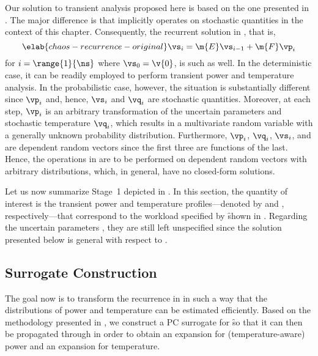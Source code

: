 Our solution to transient analysis proposed here is based on the one presented
in . The major difference is that
 implicitly operates on stochastic quantities in the
context of this chapter. Consequently, the recurrent solution in
, that is,
\begin{equation} \elab{chaos-recurrence-original}
  \vs_i = \m{E} \vs_{i - 1} + \m{F} \vp_i
\end{equation}
for $i = \range{1}{\ns}$ where $\vs_0 = \v{0}$, is such as well. In the
deterministic case, it can be readily employed to perform transient power and
temperature analysis. In the probabilistic case, however, the situation is
substantially different since $\vp_i$ and, hence, $\vs_i$ and $\vq_i$ are
stochastic quantities. Moreover, at each step, $\vp_i$ is an arbitrary
transformation of the uncertain parameters \vu and stochastic temperature
$\vq_i$, which results in a multivariate random variable with a generally
unknown probability distribution. Furthermore, $\vp_i$, $\vq_i$, $\vs_i$, and
\vu are dependent random vectors since the first three are functions of the
last. Hence, the operations in  are to be
performed on dependent random vectors with arbitrary distributions, which, in
general, have no closed-form solutions.

Let us now summarize Stage~1 depicted in . In this section,
the quantity of interest \g is the transient power and temperature
profiles---denoted by \mp and \mq, respectively---that correspond to the
workload specified by \f shown in . Regarding the
uncertain parameters \vu, they are still left unspecified since the solution
presented below is general with respect to \vu.

\subsection{Surrogate Construction}

The goal now is to transform the recurrence in 
in such a way that the distributions of power and temperature can be estimated
efficiently. Based on the methodology presented in
, we construct a \ac{PC} surrogate for \f so
that it can then be propagated through  in order
to obtain an expansion for (temperature-aware) power and an expansion for
temperature.

